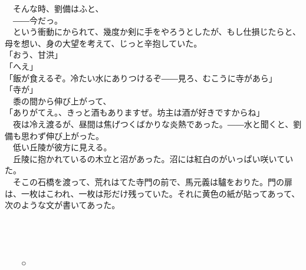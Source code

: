 \documentclass[
  paper=a5,
  fontsize=10pt,
  jafontsize=9.5pt,
  tate,                  %
  open_bracket_pos=nibu, %
]{jlreq}
\begin{document}
　そんな時、劉備はふと、\\


　――今だっ。\\


　という衝動にかられて、幾度か剣に手をやろうとしたが、もし仕損じたらと、母を想い、身の大望を考えて、じっと辛抱していた。\\


「おう、甘洪」\\


「へえ」\\


「飯が食えるぞ。冷たい水にありつけるぞ――見ろ、むこうに寺があら」\\


「寺が」\\


　黍の間から伸び上がって、\\


「ありがてえ。、きっと酒もありますぜ。坊主は酒が好きですからね」\\


　夜は冷え渡るが、昼間は焦げつくばかりな炎熱であった。――水と聞くと、劉備も思わず伸び上がった。\\


　低い丘陵が彼方に見える。\\


　丘陵に抱かれているの木立と沼があった。沼には紅白のがいっぱい咲いていた。\\


　そこの石橋を渡って、荒れはてた寺門の前で、馬元義は驢をおりた。門の扉は、一枚はこわれ、一枚は形だけ残っていた。それに黄色の紙が貼ってあって、次のような文が書いてあった。\\

\\

\\

\\

\\


　　○\\

\\
\end{document}
